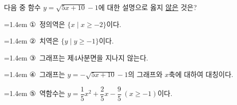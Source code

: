 \hspace*{2mm}\begin{minipage}[t]{\dimexpr\linewidth-2mm\relax}\vspace{0pt}
다음 중 함수 $y=\sqrt{5x+10}-1$에 대한 설명으로 옳지 \underline{않은} 것은?
\par\medskip\par\noindent\hangindent=1.4em {\small ①}\ 정의역은 $\{x\mid x\ge -2\}$이다.\par\noindent\hangindent=1.4em {\small ②}\ 치역은 $\{y\mid y\ge -1\}$이다.\par\noindent\hangindent=1.4em {\small ③}\ 그래프는 제$4$사분면을 지나지 않는다.\par\noindent\hangindent=1.4em {\small ④}\ 그래프는 $y=-\sqrt{5x+10}-1$의 그래프와 $x$축에 대하여 대칭이다.\par\noindent\hangindent=1.4em {\small ⑤}\ 역함수는 $y=\dfrac{1}{5}x^2+\dfrac{2}{5}x-\dfrac{9}{5}\ (x\ge -1)$이다.\par\medskip\end{minipage}
